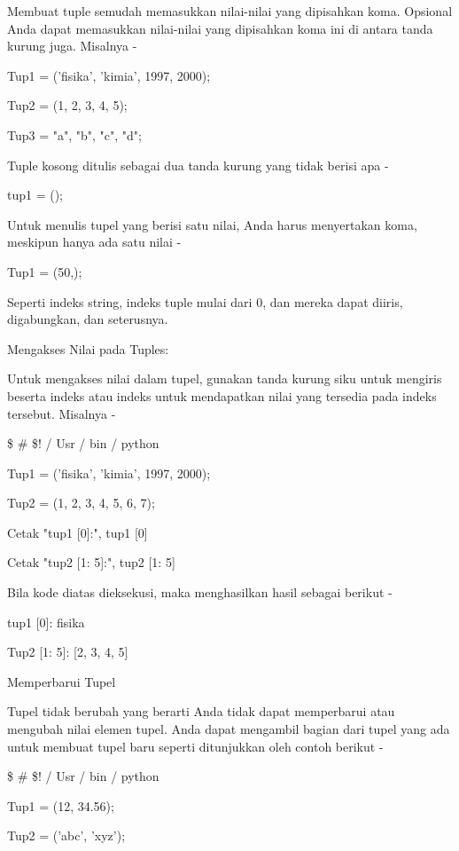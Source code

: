 Membuat tuple semudah memasukkan nilai-nilai yang dipisahkan koma. Opsional Anda dapat memasukkan nilai-nilai yang dipisahkan koma ini di antara tanda kurung juga. Misalnya - \par
\vspace{12pt}
Tup1 = ('fisika', 'kimia', 1997, 2000); \par
Tup2 = (1, 2, 3, 4, 5); \par
Tup3 = "a", "b", "c", "d"; \par
Tuple kosong ditulis sebagai dua tanda kurung yang tidak berisi apa - \par
tup1 = (); \par
Untuk menulis tupel yang berisi satu nilai, Anda harus menyertakan koma, meskipun hanya ada satu nilai - \par
Tup1 = (50,); \par
Seperti indeks string, indeks tuple mulai dari 0, dan mereka dapat diiris, digabungkan, dan seterusnya. \par
Mengakses Nilai pada Tuples: \par
Untuk mengakses nilai dalam tupel, gunakan tanda kurung siku untuk mengiris beserta indeks atau indeks untuk mendapatkan nilai yang tersedia pada indeks tersebut. Misalnya - \par
 \$  \#  \$! / Usr / bin / python \par
\vspace{12pt}
Tup1 = ('fisika', 'kimia', 1997, 2000); \par
Tup2 = (1, 2, 3, 4, 5, 6, 7); \par
\vspace{12pt}
Cetak "tup1 [0]:", tup1 [0] \par
Cetak "tup2 [1: 5]:", tup2 [1: 5] \par
Bila kode diatas dieksekusi, maka menghasilkan hasil sebagai berikut - \par
tup1 [0]: fisika \par
Tup2 [1: 5]: [2, 3, 4, 5] \par
Memperbarui Tupel \par
Tupel tidak berubah yang berarti Anda tidak dapat memperbarui atau mengubah nilai elemen tupel. Anda dapat mengambil bagian dari tupel yang ada untuk membuat tupel baru seperti ditunjukkan oleh contoh berikut - \par
 \$  \#  \$! / Usr / bin / python \par
\vspace{12pt}
Tup1 = (12, 34.56); \par
Tup2 = ('abc', 'xyz'); \par
